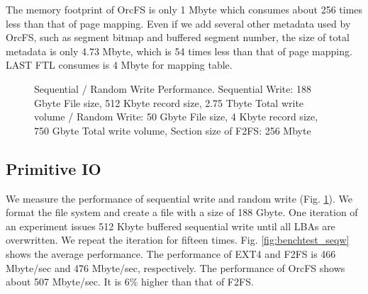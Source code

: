 \documentclass[pageno]{jpaper}
\begin{document}
The memory footprint of OrcFS is only 1 Mbyte which consumes
about 256 times less than that of page mapping. Even if we add several
other metadata used by OrcFS, such as segment bitmap and buffered
segment number, the size of total metadata is only 4.73 Mbyte, which
is 54 times less than that of page mapping. LAST FTL consumes is 4 Mbyte
for mapping table.


\begin{figure}[t]
\centering

 \caption{Sequential / Random Write Performance. Sequential Write: 188
   Gbyte File size, 512 Kbyte record size, 2.75 Tbyte Total write
   volume / Random Write: 50 Gbyte File size, 4 Kbyte record size, 750
   Gbyte Total write volume, Section size of F2FS: 256 Mbyte}
 \label{fig:benchtest}
\end{figure}


\subsection{Primitive IO}
\label{subsec:io_performance}


We measure the performance of sequential write and random write
(Fig. \ref{fig:benchtest}).  We format the file system and create a
file with a size of 188 Gbyte. One iteration of an experiment issues
512 Kbyte buffered sequential write until all LBAs are overwritten. We
repeat the iteration for fifteen times.  Fig. \ref{fig:benchtest_seqw}
shows the average performance. The performance of EXT4 and F2FS is 466
Mbyte/sec and 476 Mbyte/sec, respectively. The performance of OrcFS
shows about 507 Mbyte/sec. It is 6$\%$ higher than that of F2FS.
\end{document}
